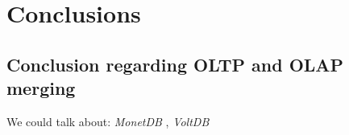 \documentclass[10pt]{article} %
\begin{document}

\section{Conclusions} 

\subsection{Conclusion regarding OLTP and OLAP merging}




We could talk about: \emph{ MonetDB }, \emph{ VoltDB }





\end{document}
